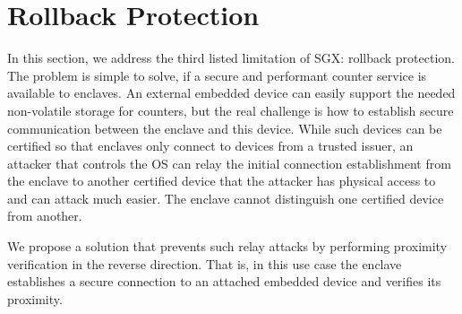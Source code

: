 \section{\name Rollback Protection}
\label{sec:rollback}



In this section, we address the third listed limitation of SGX: rollback protection. The problem is simple to solve, if a secure and performant counter service is available to enclaves. An external embedded device can easily support the needed non-volatile storage for counters, but the real challenge is how to establish secure communication between the enclave and this device. While such devices can be certified so that enclaves only connect to devices from a trusted issuer, an attacker that controls the OS can relay the initial connection establishment from the enclave to another certified device that the attacker has physical access to and can attack much easier. The enclave cannot distinguish one certified device from another.

We propose a solution that prevents such relay attacks by performing proximity verification in the reverse direction. That is, in this use case the enclave establishes a secure connection to an attached embedded device and verifies its proximity.  


 
